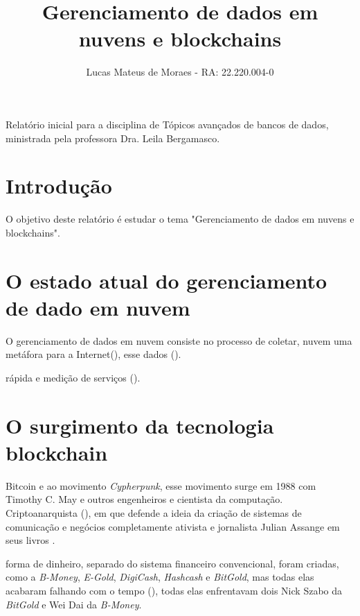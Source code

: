 \documentclass[acronym,symbols]{fei}
\author{Lucas Mateus de Moraes - RA: 22.220.004-0}
\title{Gerenciamento de dados em nuvens e blockchains}
\begin{document}
\maketitle

\begin{folhaderosto}
Relatório inicial para a disciplina de Tópicos avançados de bancos de dados, ministrada pela professora Dra. Leila Bergamasco.
\end{folhaderosto}

\begin{epigrafe}
\end{epigrafe}

\tableofcontents

\chapter{Introdução}

O objetivo deste relatório é estudar o tema "Gerenciamento de dados em nuvens e blockchains".

\chapter{O estado atual do gerenciamento de dado em nuvem}

O gerenciamento de dados em nuvem consiste no processo de coletar,  nuvem uma metáfora para a Internet(\textcite{awsDataManagement}), esse  dados (\textcite{computacaoNuvemIfrn}).

 rápida e medição de serviços (\textcite{computacaoNuvemUfc}).


\chapter{O surgimento da tecnologia blockchain}

 Bitcoin e ao movimento \textit{Cypherpunk}, esse movimento surge em 1988 com Timothy C. May e outros engenheiros e cientista da computação.  Criptoanarquista (\textcite{cryptoManifesto}), em que defende a ideia da criação de sistemas de comunicação e negócios completamente  ativista e jornalista Julian Assange em seus livros \cite{assange}. 

 forma de dinheiro, separado do sistema financeiro convencional, foram criadas, como a \textit{B-Money}, \textit{E-Gold}, \textit{DigiCash}, \textit{Hashcash} e \textit{BitGold}, mas todas elas acabaram falhando com o tempo (\textcite{predecessoresBtc}), todas elas enfrentavam dois  Nick Szabo da \textit{BitGold} e Wei Dai da \textit{B-Money}.
\end{document}
